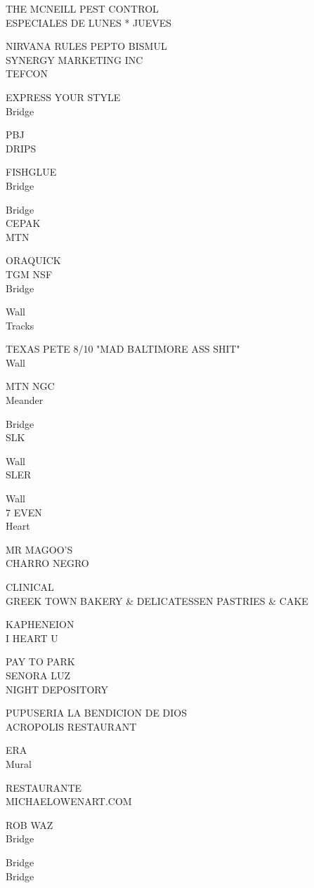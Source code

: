 \documentclass[10pt,letterpaper]{article}
\begin{document}
THE MCNEILL PEST CONTROL\\
ESPECIALES DE LUNES * JUEVES

NIRVANA RULES PEPTO BISMUL\\
SYNERGY MARKETING INC\\
TEFCON

EXPRESS YOUR STYLE\\
Bridge

PBJ\\
DRIPS

FISHGLUE\\
Bridge

Bridge\\
CEPAK\\
MTN

ORAQUICK\\
TGM NSF\\
Bridge

Wall\\
Tracks

TEXAS PETE 8/10 "MAD BALTIMORE ASS SHIT"\\
Wall

MTN NGC\\
Meander

Bridge\\
SLK

Wall\\
SLER

Wall\\
7 EVEN\\
Heart

MR MAGOO'S\\
CHARRO NEGRO

CLINICAL\\
GREEK TOWN BAKERY \& DELICATESSEN PASTRIES \& CAKE

KAPHENEION\\
I HEART U

PAY TO PARK\\
SENORA LUZ\\
NIGHT DEPOSITORY

PUPUSERIA LA BENDICION DE DIOS\\
ACROPOLIS RESTAURANT

ERA\\
Mural

RESTAURANTE\\
MICHAELOWENART.COM

ROB WAZ\\
Bridge

Bridge\\
Bridge
\end{document}

